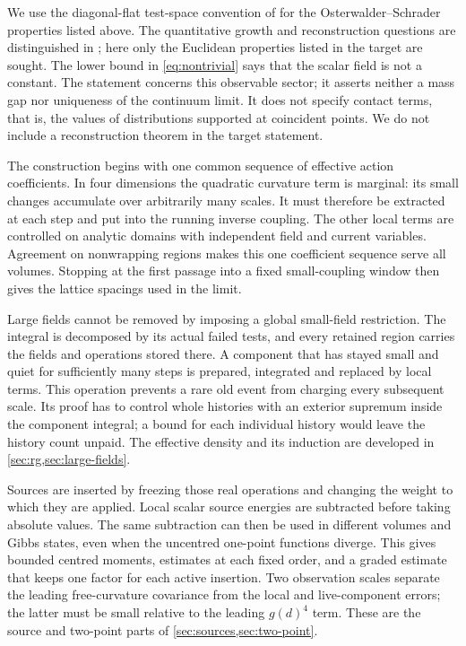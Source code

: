 \documentclass[11pt,letterpaper,reqno]{amsart}
\theoremstyle{definition}
\theoremstyle{remark}
\begin{document}
We use the diagonal-flat test-space convention of
\cite[\S\S2--3, pp.~85--89]{OS1973} for the
Osterwalder--Schrader properties listed above.
The quantitative growth and reconstruction questions are distinguished in
\cite[\S IV.1, pp.~287--288]{OS1975}; here only the Euclidean properties
listed in the target are sought. The lower bound in
\eqref{eq:nontrivial} says that the scalar field is not a constant.
The statement concerns this observable sector; it asserts neither a
mass gap nor uniqueness of the continuum limit. It does not specify
contact terms, that is, the values of distributions supported at
coincident points. We do not include a reconstruction theorem in the
target statement.

The construction begins with one common sequence of effective action
coefficients. In four dimensions the quadratic curvature term is
marginal: its small changes accumulate over arbitrarily many scales.
It must therefore be extracted at each step and put into the running
inverse coupling. The other local terms are controlled on analytic
domains with independent field and current variables. Agreement on
nonwrapping regions makes this one coefficient sequence serve all
volumes. Stopping at the first passage into a fixed small-coupling
window then gives the lattice spacings used in the limit.

Large fields cannot be removed by imposing a global small-field
restriction. The integral is decomposed by its actual failed tests,
and every retained region carries the fields and operations stored
there. A component that has stayed small and quiet for sufficiently
many steps is prepared, integrated and replaced by local terms. This
operation prevents a rare old event from charging every subsequent
scale. Its proof has to control whole histories with an exterior
supremum inside the component integral; a bound for each individual
history would leave the history count unpaid. The effective density
and its induction are developed in \cref{sec:rg,sec:large-fields}.

Sources are inserted by freezing those real operations and changing
the weight to which they are applied. Local scalar source energies
are subtracted before taking absolute values. The same subtraction
can then be used in different volumes and Gibbs states, even when
the uncentred one-point functions diverge. This gives bounded centred
moments, estimates at each fixed order, and a graded estimate that
keeps one factor for each active insertion. Two observation scales
separate the leading free-curvature covariance from the local and
live-component errors; the latter must be small relative to the
leading $g(d)^4$ term. These are the source and two-point parts of
\cref{sec:sources,sec:two-point}.
\end{document}
